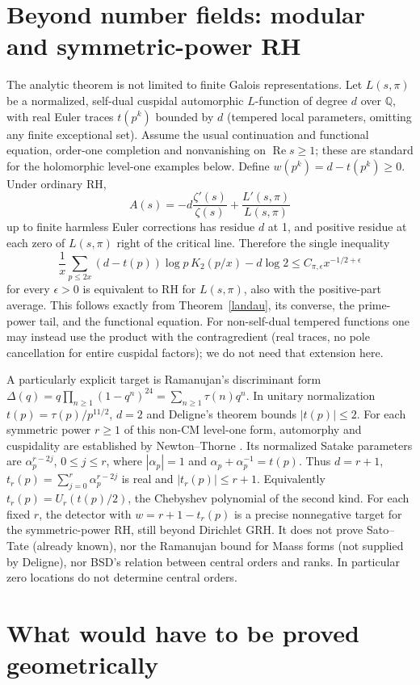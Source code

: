 \documentclass[11pt]{article}
\theoremstyle{definition}\newtheorem{definition}[theorem]{Definition}
\newcommand{\Q}{\mathbb Q}\newcommand{\C}{\mathbb C}\newcommand{\R}{\mathbb R}\newcommand{\Rea}{\operatorname{Re}}\newcommand{\Frob}{\operatorname{Frob}}\newcommand{\Gal}{\operatorname{Gal}}\newcommand{\pos}[1]{\left(#1\right)_+}
\begin{document}
\section{Beyond number fields: modular and symmetric-power RH}
The analytic theorem is not limited to finite Galois representations. Let $L(s,\pi)$ be a normalized, self-dual cuspidal automorphic $L$-function of degree $d$ over $\Q$, with real Euler traces $t(p^k)$ bounded by $d$ (tempered local parameters, omitting any finite exceptional set). Assume the usual continuation and functional equation, order-one completion and nonvanishing on $\Rea s\ge1$; these are standard for the holomorphic level-one examples below. Define $w(p^k)=d-t(p^k)\ge0$. Under ordinary RH,
\[
 A(s)=-d\frac{\zeta'(s)}{\zeta(s)}+\frac{L'(s,\pi)}{L(s,\pi)}
\]
up to finite harmless Euler corrections has residue $d$ at 1, and positive residue at each zero of $L(s,\pi)$ right of the critical line. Therefore the single inequality
\[
 \frac1x\sum_{p\le2x} (d-t(p))\log p\,K_2(p/x)-d\log2
 \le C_{\pi,\epsilon}x^{-1/2+\epsilon}
\]
for every $\epsilon>0$ is equivalent to RH for $L(s,\pi)$, also with the positive-part average. This follows exactly from Theorem~\ref{landau}, its converse, the prime-power tail, and the functional equation. For non-self-dual tempered functions one may instead use the product with the contragredient (real traces, no pole cancellation for entire cuspidal factors); we do not need that extension here.

A particularly explicit target is Ramanujan's discriminant form $\Delta(q)=q\prod_{n\ge1}(1-q^n)^{24}=\sum_{n\ge1}\tau(n)q^n$. In unitary normalization $t(p)=\tau(p)/p^{11/2}$, $d=2$ and Deligne's theorem \cite{deligne} bounds $|t(p)|\le2$. For each symmetric power $r\ge1$ of this non-CM level-one form, automorphy and cuspidality are established by Newton--Thorne \cite{nt}. Its normalized Satake parameters are $\alpha_p^{r-2j}$, $0\le j\le r$, where $|\alpha_p|=1$ and $\alpha_p+\alpha_p^{-1}=t(p)$. Thus $d=r+1$, $t_r(p)=\sum_{j=0}^r\alpha_p^{r-2j}$ is real and $|t_r(p)|\le r+1$. Equivalently $t_r(p)=U_r(t(p)/2)$, the Chebyshev polynomial of the second kind. For each fixed $r$, the detector with $w=r+1-t_r(p)$ is a precise nonnegative target for the symmetric-power RH, still beyond Dirichlet GRH. It does not prove Sato--Tate (already known), nor the Ramanujan bound for Maass forms (not supplied by Deligne), nor BSD's relation between central orders and ranks. In particular zero locations do not determine central orders.

\section{What would have to be proved geometrically}\label{geom}
\end{document}

